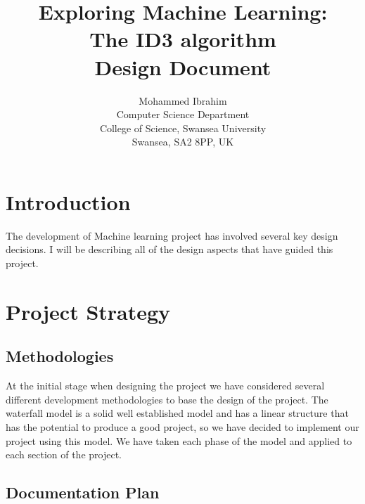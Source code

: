 \documentclass{article}
\begin{document}
\title{Exploring Machine Learning:\\
  The ID3 algorithm\\
  		Design Document}


\author{Mohammed Ibrahim\\
 Computer Science Department\\
  College of Science, Swansea University\\
  Swansea, SA2 8PP, UK
}

\pagebreak

\maketitle
\pagebreak
{}

\pagebreak

\tableofcontents
\pagebreak


\section{Introduction}
\label{sec:intro}

The development of Machine learning project has involved several key design decisions. I will be describing all of the design aspects that have guided this project.

\section{Project Strategy}
\label{sec: pro}

\subsection{Methodologies}
\label{sec:meth}

At the initial stage when designing the project we have considered several different development methodologies to base the design of the project. The waterfall model is a solid well established model and has a linear structure that has the potential to produce a good project, so we have decided to implement our project using this model. We have taken each phase of the model and applied to each section of the project.

\subsection{Documentation Plan}
\label{sec:docpl}
\end{document}
